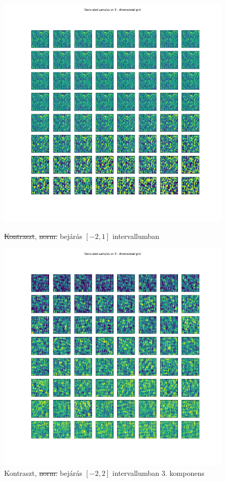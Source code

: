 \documentclass[12pt, english]{article}
\begin{document}
\begin{figure}[H] 
  \label{fig:contrast-correlation} 
  \begin{minipage}{0.33\linewidth}
    \centering
    \includegraphics[width=.72\linewidth]{sweep/no_norm_no_contrast_sweep_minus_two_to_one.png} 
    \caption{\st{Kontraszt}, \st{norm.} \newline bejárás $[-2, 1]$ intervallumban} 
    \label{fig:no-contrast-no-norm-sweep}
  \end{minipage}%
  \begin{minipage}{0.33\linewidth}
    \centering
    \includegraphics[width=.72\linewidth]{sweep/no_norm_contrast_sweep_minus_two_to_two_3rd_param.png} 
    \caption{Kontraszt, \st{norm.} \newline bejárás $[-2, 2]$ intervallumban $3.$ komponens} 

\end{minipage}
\end{figure}
\end{document}
